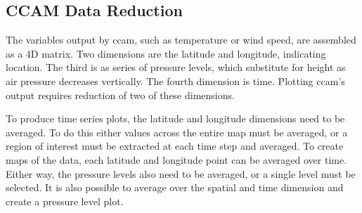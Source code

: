 \subsection{CCAM Data Reduction}
\label{subsec:datared}

The variables output by \gls{ccam}, such as temperature or wind speed, are assembled as a 4D matrix. Two dimensions are the latitude and longitude, indicating location. The third is as series of pressure levels, which substitute for height as air pressure decreases vertically. The fourth dimension is time. Plotting \gls{ccam}'s output requires reduction of two of these dimensions.

To produce time series plots, the latitude and longitude dimensions need to be averaged. To do this either values across the entire map must be averaged, or a region of interest must be extracted at each time step and averaged. To create maps of the data, each latitude and longitude point can be averaged over time. Either way, the pressure levels also need to be averaged, or a single level must be selected. It is also possible to average over the spatial and time dimension and create a pressure level plot.


